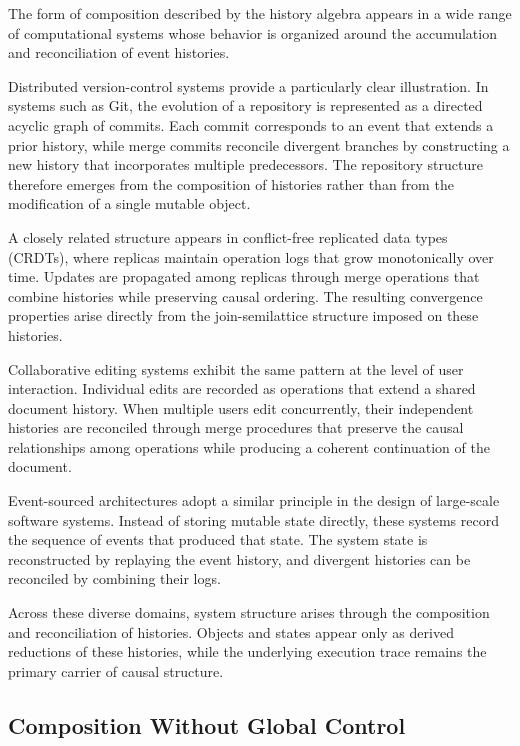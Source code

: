 \documentclass[12pt]{article}
\begin{document}
The form of composition described by the history algebra
appears in a wide range of computational systems whose
behavior is organized around the accumulation and
reconciliation of event histories.

Distributed version-control systems provide a particularly
clear illustration. In systems such as Git, the evolution
of a repository is represented as a directed acyclic graph
of commits. Each commit corresponds to an event that extends
a prior history, while merge commits reconcile divergent
branches by constructing a new history that incorporates
multiple predecessors. The repository structure therefore
emerges from the composition of histories rather than from
the modification of a single mutable object.

A closely related structure appears in conflict-free
replicated data types (CRDTs), where replicas maintain
operation logs that grow monotonically over time. Updates
are propagated among replicas through merge operations that
combine histories while preserving causal ordering. The
resulting convergence properties arise directly from the
join-semilattice structure imposed on these histories.

Collaborative editing systems exhibit the same pattern at
the level of user interaction. Individual edits are recorded
as operations that extend a shared document history. When
multiple users edit concurrently, their independent
histories are reconciled through merge procedures that
preserve the causal relationships among operations while
producing a coherent continuation of the document.

Event-sourced architectures adopt a similar principle in
the design of large-scale software systems. Instead of
storing mutable state directly, these systems record the
sequence of events that produced that state. The system
state is reconstructed by replaying the event history,
and divergent histories can be reconciled by combining
their logs.

Across these diverse domains, system structure arises
through the composition and reconciliation of histories.
Objects and states appear only as derived reductions of
these histories, while the underlying execution trace
remains the primary carrier of causal structure.

\subsection{Composition Without Global Control}
\end{document}
